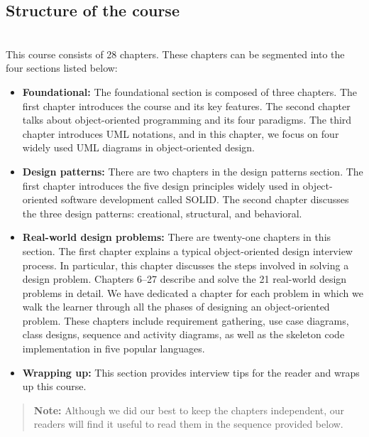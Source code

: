 

\subsection{Structure of the course}\label{structure-of-the-course}
\\
This course consists of 28 chapters. These chapters can be segmented into the four sections listed below:

\begin{itemize}
\item
\textbf{Foundational:} The foundational section is composed of three chapters. The first chapter introduces the course and its key features. The second chapter talks about object-oriented programming and its four paradigms. The third chapter introduces UML notations, and in this chapter, we focus on four widely used UML diagrams in object-oriented design.
\item
\textbf{Design patterns:} There are two chapters in the design patterns section. The first chapter introduces the five design principles widely used in object-oriented software development called SOLID. The second chapter discusses the three design patterns: creational, structural, and behavioral.
\item
\textbf{Real-world design problems:} There are twenty-one chapters in this section. The first chapter explains a typical object-oriented design interview process. In particular, this chapter discusses the steps involved in solving a design problem. Chapters 6--27 describe and solve the 21 real-world design problems in detail. We have dedicated a chapter for each problem in which we walk the learner through all the phases of designing an object-oriented problem. These chapters include requirement gathering, use case diagrams, class designs, sequence and activity diagrams, as well as the skeleton code implementation in five popular languages.
\item
\textbf{Wrapping up:} This section provides interview tips for the reader and wraps up this course.
\end{itemize}
\begin{quote}
\textbf{Note:} Although we did our best to keep the chapters independent, our readers will find it useful to read them in the sequence provided below.
\end{quote}

